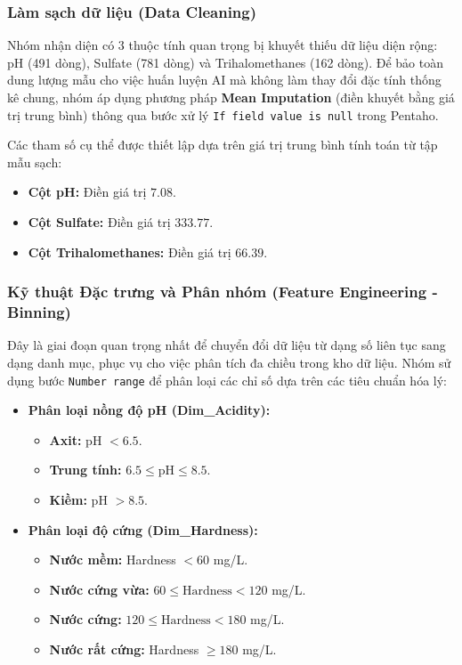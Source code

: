 \subsubsection{Làm sạch dữ liệu (Data Cleaning)}
Nhóm nhận diện có 3 thuộc tính quan trọng bị khuyết thiếu dữ liệu diện rộng: pH (491 dòng), Sulfate (781 dòng) và Trihalomethanes (162 dòng). Để bảo toàn dung lượng mẫu cho việc huấn luyện AI mà không làm thay đổi đặc tính thống kê chung, nhóm áp dụng phương pháp \textbf{Mean Imputation} (điền khuyết bằng giá trị trung bình) thông qua bước xử lý \texttt{If field value is null} trong Pentaho.

Các tham số cụ thể được thiết lập dựa trên giá trị trung bình tính toán từ tập mẫu sạch:
\begin{itemize}
    \item \textbf{Cột pH:} Điền giá trị $7.08$.
    \item \textbf{Cột Sulfate:} Điền giá trị $333.77$.
    \item \textbf{Cột Trihalomethanes:} Điền giá trị $66.39$.
\end{itemize}

\subsubsection{Kỹ thuật Đặc trưng và Phân nhóm (Feature Engineering - Binning)}
Đây là giai đoạn quan trọng nhất để chuyển đổi dữ liệu từ dạng số liên tục sang dạng danh mục, phục vụ cho việc phân tích đa chiều trong kho dữ liệu. Nhóm sử dụng bước \texttt{Number range} để phân loại các chỉ số dựa trên các tiêu chuẩn hóa lý:

\begin{itemize}
    \item \textbf{Phân loại nồng độ pH (Dim\_Acidity):}
    \begin{itemize}
        \item \textbf{Axit:} pH $< 6.5$.
        \item \textbf{Trung tính:} $6.5 \le \text{pH} \le 8.5$.
        \item \textbf{Kiềm:} pH $> 8.5$.
    \end{itemize}
    \item \textbf{Phân loại độ cứng (Dim\_Hardness):}
    \begin{itemize}
        \item \textbf{Nước mềm:} Hardness $< 60$ mg/L.
        \item \textbf{Nước cứng vừa:} $60 \le \text{Hardness} < 120$ mg/L.
        \item \textbf{Nước cứng:} $120 \le \text{Hardness} < 180$ mg/L.
        \item \textbf{Nước rất cứng:} Hardness $\ge 180$ mg/L.
    \end{itemize}
\end{itemize}

